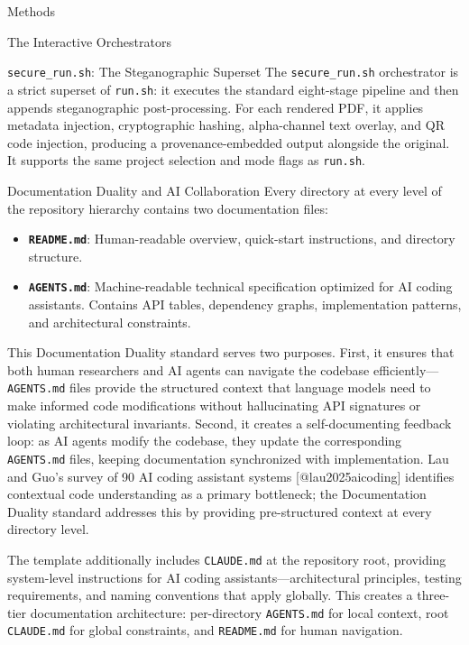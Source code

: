\documentclass[
  ignorenonframetext,
]{beamer}
\providecommand{\tightlist}{%
  \setlength{\itemsep}{0pt}\setlength{\parskip}{0pt}}
\begin{document}
\begin{frame}[fragile]{Methods}
\begin{block}{The Interactive Orchestrators}
\begin{block}{\texttt{secure\_run.sh}: The Steganographic Superset}
\protect{}\label{secure_run.sh-the-steganographic-superset}
The \texttt{secure\_run.sh} orchestrator is a strict superset of
\texttt{run.sh}: it executes the standard eight-stage pipeline and then
appends steganographic post-processing. For each rendered PDF, it
applies metadata injection, cryptographic hashing, alpha-channel text
overlay, and QR code injection, producing a provenance-embedded output
alongside the original. It supports the same project selection and mode
flags as \texttt{run.sh}.
\end{block}
\end{block}

\begin{block}{Documentation Duality and AI Collaboration}
\protect{}\label{documentation-duality-and-ai-collaboration}
Every directory at every level of the repository hierarchy contains two
documentation files:

\begin{itemize}
\tightlist
\item
  \textbf{\texttt{README.md}}: Human-readable overview, quick-start
  instructions, and directory structure.
\item
  \textbf{\texttt{AGENTS.md}}: Machine-readable technical specification
  optimized for AI coding assistants. Contains API tables, dependency
  graphs, implementation patterns, and architectural constraints.
\end{itemize}

This Documentation Duality standard serves two purposes. First, it
ensures that both human researchers and AI agents can navigate the
codebase efficiently---\texttt{AGENTS.md} files provide the structured
context that language models need to make informed code modifications
without hallucinating API signatures or violating architectural
invariants. Second, it creates a self-documenting feedback loop: as AI
agents modify the codebase, they update the corresponding
\texttt{AGENTS.md} files, keeping documentation synchronized with
implementation. Lau and Guo's survey of 90 AI coding assistant systems
{[}@lau2025aicoding{]} identifies contextual code understanding as a
primary bottleneck; the Documentation Duality standard addresses this by
providing pre-structured context at every directory level.

The template additionally includes \texttt{CLAUDE.md} at the repository
root, providing system-level instructions for AI coding
assistants---architectural principles, testing requirements, and naming
conventions that apply globally. This creates a three-tier documentation
architecture: per-directory \texttt{AGENTS.md} for local context, root
\texttt{CLAUDE.md} for global constraints, and \texttt{README.md} for
human navigation.


\end{block}
\end{frame}
\end{document}
